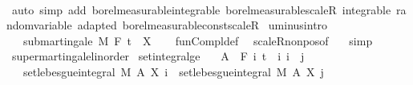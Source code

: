 \begin{isabellebody}
\ \ \isacommand{{\isacharbraceright}{\kern0pt}}\isamarkupfalse%
\isanewline
{}\isamarkupfalse%
\ {\isacharparenleft}{\kern0pt}auto\ simp\ add{\isacharcolon}{\kern0pt}\ borel{\isacharunderscore}{\kern0pt}measurable{\isacharunderscore}{\kern0pt}integrable\ borel{\isacharunderscore}{\kern0pt}measurable{\isacharunderscore}{\kern0pt}scaleR\ integrable\ random{\isacharunderscore}{\kern0pt}variable\ adapted\ borel{\isacharunderscore}{\kern0pt}measurable{\isacharunderscore}{\kern0pt}const{\isacharunderscore}{\kern0pt}scaleR{\isacharparenright}{\kern0pt}%
\endisatagproof
{\isafoldproof}%
%
\isadelimproof
\isanewline
%
\endisadelimproof
\isanewline
{}\isamarkupfalse%
\ uminus{\isacharbrackleft}{\kern0pt}intro{\isacharbrackright}{\kern0pt}{\isacharcolon}{\kern0pt}\isanewline
\ \ \ {\isachardoublequoteopen}submartingale\ M\ F\ t\ {\isacharparenleft}{\kern0pt}{\isacharminus}{\kern0pt}\ X{\isacharparenright}{\kern0pt}{\isachardoublequoteclose}\isanewline
%
\isadelimproof
\ \ %
\endisadelimproof
%
\isatagproof
{}\isamarkupfalse%
\ fun{\isacharunderscore}{\kern0pt}Compl{\isacharunderscore}{\kern0pt}def\ \isamarkupfalse%
\ scaleR{\isacharunderscore}{\kern0pt}nonpos{\isacharbrackleft}{\kern0pt}of\ {\isachardoublequoteopen}{\isacharminus}{\kern0pt}{}{\isachardoublequoteclose}{\isacharbrackright}{\kern0pt}\ \isamarkupfalse%
\ simp%
\endisatagproof
{\isafoldproof}%
%
\isadelimproof
\isanewline
%
\endisadelimproof
\isanewline
{}\isamarkupfalse%
\isanewline
\isanewline
{}\isamarkupfalse%
\ supermartingale{\isacharunderscore}{\kern0pt}linorder\isanewline
{}\isanewline
\isanewline
{}\isamarkupfalse%
\ set{\isacharunderscore}{\kern0pt}integral{\isacharunderscore}{\kern0pt}ge{\isacharcolon}{\kern0pt}\isanewline
\ \ \ {\isachardoublequoteopen}A\ {\isasymin}\ F\ i{\isachardoublequoteclose}\ {\isachardoublequoteopen}t\ {\isasymle}\ i{\isachardoublequoteclose}\ {\isachardoublequoteopen}i\ {\isasymle}\ j{\isachardoublequoteclose}\isanewline
\ \ \ {\isachardoublequoteopen}set{\isacharunderscore}{\kern0pt}lebesgue{\isacharunderscore}{\kern0pt}integral\ M\ A\ {\isacharparenleft}{\kern0pt}X\ i{\isacharparenright}{\kern0pt}\ {\isasymge}\ set{\isacharunderscore}{\kern0pt}lebesgue{\isacharunderscore}{\kern0pt}integral\ M\ A\ {\isacharparenleft}{\kern0pt}X\ j{\isacharparenright}{\kern0pt}{\isachardoublequoteclose}\isanewline
%
\isadelimproof

\end{isabellebody}
